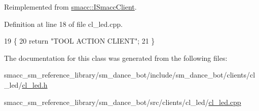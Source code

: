Reimplemented from \hyperlink{classsmacc_1_1ISmaccClient_a20846aabfd1de832aa27d7a8237a1742}{smacc\+::\+I\+Smacc\+Client}.



Definition at line 18 of file cl\+\_\+led.\+cpp.


\begin{DoxyCode}
19 \{
20     \textcolor{keywordflow}{return} \textcolor{stringliteral}{"TOOL ACTION CLIENT"};
21 \}
\end{DoxyCode}


The documentation for this class was generated from the following files\+:\begin{DoxyCompactItemize}
\item 
smacc\+\_\+sm\+\_\+reference\+\_\+library/sm\+\_\+dance\+\_\+bot/include/sm\+\_\+dance\+\_\+bot/clients/cl\+\_\+led/\hyperlink{cl__led_8h}{cl\+\_\+led.\+h}\item 
smacc\+\_\+sm\+\_\+reference\+\_\+library/sm\+\_\+dance\+\_\+bot/src/clients/cl\+\_\+led/\hyperlink{cl__led_8cpp}{cl\+\_\+led.\+cpp}\end{DoxyCompactItemize}

